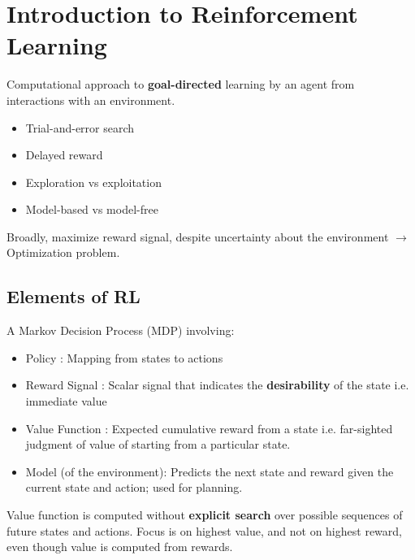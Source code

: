 \section{Introduction to Reinforcement Learning}


Computational approach to \textbf{goal-directed} learning by an agent from interactions with an environment.
\begin{itemize}
    \item Trial-and-error search
    \item Delayed reward
    \item Exploration vs exploitation
    \item Model-based vs model-free
\end{itemize}

Broadly, maximize reward signal, despite uncertainty about the environment $\to$ Optimization problem.

\subsection{Elements of RL}
A Markov Decision Process (MDP) involving:
\begin{itemize}
    \item Policy : Mapping from states to actions
    \item Reward Signal : Scalar signal that indicates the \textbf{desirability} of the state i.e. immediate value
    \item Value Function : Expected cumulative reward from a state i.e. far-sighted judgment of value of starting from a particular state.
    \item Model (of the environment): Predicts the next state and reward given the current state and action; used for planning.
\end{itemize}

Value function is computed without \textbf{explicit search} over possible sequences of future states and actions. 
Focus is on highest value, and not on highest reward, even though value is computed from rewards.
